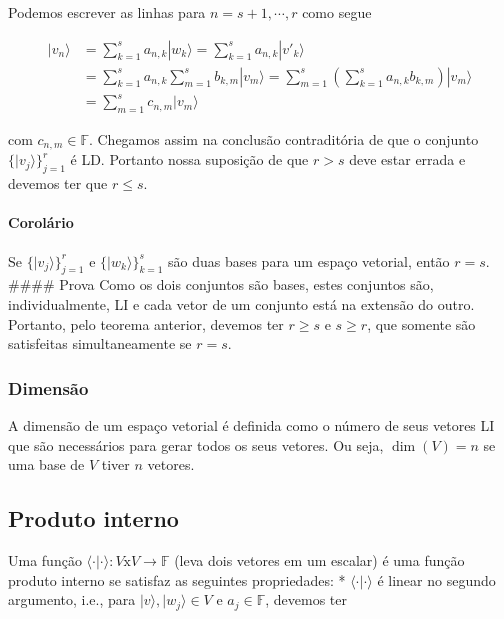 \documentclass[11pt]{article}
\begin{document}
Podemos escrever as linhas para \(n=s+1,\cdots,r\) como segue

\begin{align}
|v_{n}\rangle & = \sum_{k=1}^{s}a_{n,k}|w_{k}\rangle = \sum_{k=1}^{s}a_{n,k}|v'_{k}\rangle \\
& = \sum_{k=1}^{s}a_{n,k}\sum_{m=1}^{s}b_{k,m}|v_{m}\rangle = \sum_{m=1}^{s}\left(\sum_{k=1}^{s}a_{n,k}b_{k,m}\right)|v_{m}\rangle \\
& = \sum_{m=1}^{s}c_{n,m}|v_{m}\rangle 
\end{align}

com \(c_{n,m}\in\mathbb{F}\). Chegamos assim na conclusão contraditória
de que o conjunto \(\{|v_{j}\rangle\}_{j=1}^{r}\) é LD. Portanto nossa
suposição de que \(r>s\) deve estar errada e devemos ter que \(r\le s\).

    \paragraph{Corolário}\label{coroluxe1rio}

Se \(\{|v_{j}\rangle\}_{j=1}^{r}\) e \(\{|w_{k}\rangle\}_{k=1}^{s}\) são
duas bases para um espaço vetorial, então \(r=s\). \#\#\#\# Prova Como
os dois conjuntos são bases, estes conjuntos são, individualmente, LI e
cada vetor de um conjunto está na extensão do outro. Portanto, pelo
teorema anterior, devemos ter \(r\ge s\) e \(s\ge r\), que somente são
satisfeitas simultaneamente se \(r=s\).

    \subsubsection{Dimensão}\label{dimensuxe3o}

A dimensão de um espaço vetorial é definida como o número de seus
vetores LI que são necessários para gerar todos os seus vetores. Ou
seja, \(\dim(V)=n\) se uma base de \(V\) tiver \(n\) vetores.

    \subsection{Produto interno}\label{produto-interno}

Uma função
\(\langle \cdot|\cdot\rangle:V\text{x}V\rightarrow\mathbb{F}\) (leva
dois vetores em um escalar) é uma função produto interno se satisfaz as
seguintes propriedades: * \(\langle\cdot|\cdot\rangle\) é linear no
segundo argumento, i.e., para \(|v\rangle,|w_{j}\rangle\in V\) e
\(a_{j}\in\mathbb{F}\), devemos ter
\end{document}
